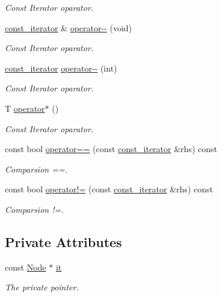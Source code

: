 \begin{DoxyCompactItemize}
\begin{DoxyCompactList}\small\item\em Const Iterator oparator. \end{DoxyCompactList}\item 
\hyperlink{classsc_1_1list_1_1const__iterator}{const\+\_\+iterator} \& \hyperlink{classsc_1_1list_1_1const__iterator_a480a4fea0a46d2a4665b524eabd53fd9}{operator-\/-\/} (void)
\begin{DoxyCompactList}\small\item\em Const Iterator oparator. \end{DoxyCompactList}\item 
\hyperlink{classsc_1_1list_1_1const__iterator}{const\+\_\+iterator} \hyperlink{classsc_1_1list_1_1const__iterator_a545f4c1885ebf352d130f6d0b5cb0599}{operator-\/-\/} (int)
\begin{DoxyCompactList}\small\item\em Const Iterator oparator. \end{DoxyCompactList}\item 
T \hyperlink{classsc_1_1list_1_1const__iterator_a53dc32d1f758d74fcaa761d64949a685}{operator$\ast$} ()
\begin{DoxyCompactList}\small\item\em Const Iterator oparator. \end{DoxyCompactList}\item 
const bool \hyperlink{classsc_1_1list_1_1const__iterator_a269ce3049d056cac500ea337dc3845a8}{operator==} (const \hyperlink{classsc_1_1list_1_1const__iterator}{const\+\_\+iterator} \&rhs) const
\begin{DoxyCompactList}\small\item\em Comparsion ==. \end{DoxyCompactList}\item 
const bool \hyperlink{classsc_1_1list_1_1const__iterator_a4a3b035ef873926e6920da7e642b9907}{operator!=} (const \hyperlink{classsc_1_1list_1_1const__iterator}{const\+\_\+iterator} \&rhs) const
\begin{DoxyCompactList}\small\item\em Comparsion !=. \end{DoxyCompactList}\end{DoxyCompactItemize}
\subsection*{Private Attributes}
\begin{DoxyCompactItemize}
\item 
const \hyperlink{structsc_1_1list_1_1_node}{Node} $\ast$ \hyperlink{classsc_1_1list_1_1const__iterator_a9fe1633dfc296c9c1f61ac24d515e648}{it}
\begin{DoxyCompactList}\small\item\em The private pointer. \end{DoxyCompactList}\end{DoxyCompactItemize}


